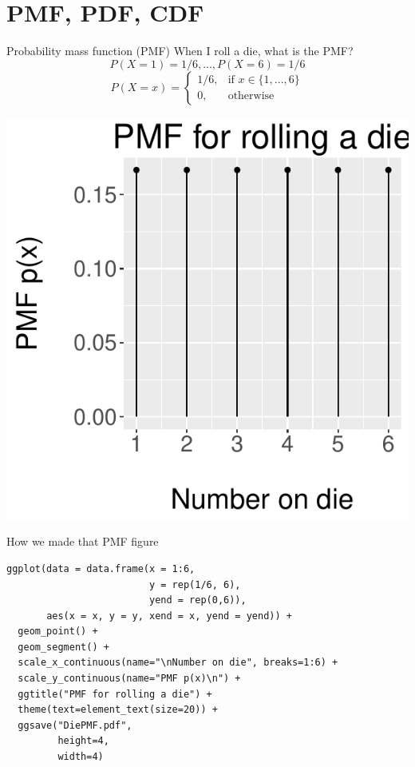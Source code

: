\documentclass{beamer}
\begin{document}
\section{PMF, PDF, CDF}
\begin{frame}{Probability mass function (PMF)}
When I roll a die, what is the PMF? \pause
$$P(X=1)=1/6,...,P(X=6)=1/6$$
$$P(X=x)=\begin{cases}
  1/6,& \text{if }x\in\{1,...,6\} \\
  0,& \text{otherwise}
\end{cases}$$
\begin{center}\includegraphics[scale=.4]{figures/DiePMF.pdf}\end{center}
\end{frame}

\begin{frame}[fragile]{How we made that PMF figure}
\begin{verbatim}
ggplot(data = data.frame(x = 1:6,
                         y = rep(1/6, 6),
                         yend = rep(0,6)),
       aes(x = x, y = y, xend = x, yend = yend)) +
  geom_point() +
  geom_segment() +
  scale_x_continuous(name="\nNumber on die", breaks=1:6) +
  scale_y_continuous(name="PMF p(x)\n") +
  ggtitle("PMF for rolling a die") +
  theme(text=element_text(size=20)) +
  ggsave("DiePMF.pdf",
         height=4,
         width=4)
\end{verbatim}
\end{frame}
\end{document}
